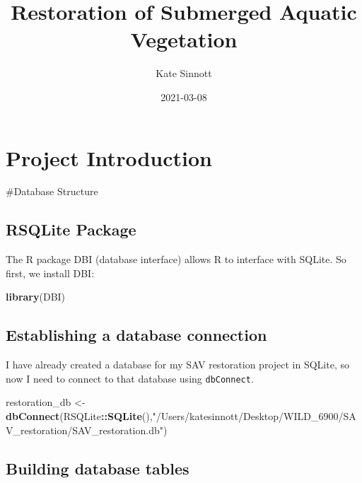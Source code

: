 \documentclass[
]{book}
\title{Restoration of Submerged Aquatic Vegetation}
\author{Kate Sinnott}
\date{2021-03-08}
\newenvironment{Shaded}{\begin{snugshade}}{\end{snugshade}}
\newcommand{\KeywordTok}[1]{\textcolor[rgb]{0.13,0.29,0.53}{\textbf{#1}}}
\newcommand{\NormalTok}[1]{#1}
\newcommand{\OperatorTok}[1]{\textcolor[rgb]{0.81,0.36,0.00}{\textbf{#1}}}
\newcommand{\StringTok}[1]{\textcolor[rgb]{0.31,0.60,0.02}{#1}}
\begin{document}
\maketitle

{
\setcounter{tocdepth}{1}
\tableofcontents
}
\hypertarget{project-introduction}{%
\chapter{Project Introduction}\label{project-introduction}}

\#Database Structure

\hypertarget{rsqlite-package}{%
\section{RSQLite Package}\label{rsqlite-package}}

The R package DBI (database interface) allows R to interface with SQLite. So first,
we install DBI:

\begin{Shaded}
\begin{Highlighting}[]
\KeywordTok{library}\NormalTok{(DBI)}
\end{Highlighting}
\end{Shaded}

\hypertarget{establishing-a-database-connection}{%
\section{Establishing a database connection}\label{establishing-a-database-connection}}

I have already created a database for my SAV restoration project in SQLite,
so now I need to connect to that database using \texttt{dbConnect}.

\begin{Shaded}
\begin{Highlighting}[]
\NormalTok{restoration_db <-}\StringTok{ }\KeywordTok{dbConnect}\NormalTok{(RSQLite}\OperatorTok{::}\KeywordTok{SQLite}\NormalTok{(),}\StringTok{"/Users/katesinnott/Desktop/WILD_6900/SAV_restoration/SAV_restoration.db"}\NormalTok{)}
\end{Highlighting}
\end{Shaded}

\hypertarget{building-database-tables}{%
\section{Building database tables}\label{building-database-tables}}
\end{document}
